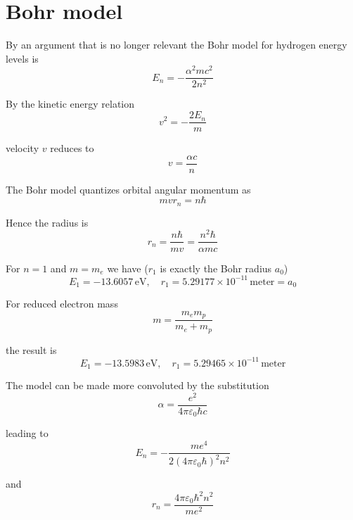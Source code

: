 


\section*{Bohr model}

By an argument that is no longer relevant the Bohr model
for hydrogen energy levels is
\begin{equation*}
E_n=-\frac{\alpha^2mc^2}{2n^2}
\end{equation*}

By the kinetic energy relation
\begin{equation*}
v^2=-\frac{2E_n}{m}
\end{equation*}

velocity $v$ reduces to
\begin{equation*}
v=\frac{\alpha c}{n}
\end{equation*}

The Bohr model quantizes orbital angular momentum as
\begin{equation*}
mvr_n=n\hbar
\end{equation*}

Hence the radius is
\begin{equation*}
r_n=\frac{n\hbar}{mv}=\frac{n^2\hbar}{\alpha mc}
\end{equation*}

For $n=1$ and $m=m_e$ we have ($r_1$ is exactly the Bohr radius $a_0$)
\begin{equation*}
E_1=-13.6057\,\text{eV},\quad
r_1=5.29177\times10^{-11}\,\text{meter}=a_0
\end{equation*}

For reduced electron mass
\begin{equation*}
m=\frac{m_em_p}{m_e+m_p}
\end{equation*}

the result is
\begin{equation*}
E_1=-13.5983\,\text{eV},\quad
r_1=5.29465\times10^{-11}\,\text{meter}
\end{equation*}

The model can be made more convoluted by the substitution
\begin{equation*}
\alpha=\frac{e^2}{4\pi\varepsilon_0\hbar c}
\end{equation*}

leading to
\begin{equation*}
E_n=-\frac{me^4}{2(4\pi\varepsilon_0\hbar)^2n^2}
\end{equation*}

and
\begin{equation*}
r_n=\frac{4\pi\varepsilon_0\hbar^2n^2}{me^2}
\end{equation*}


